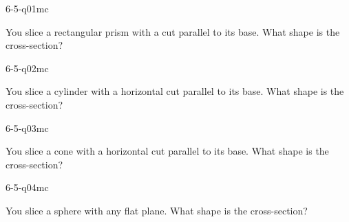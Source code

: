 

\begin{practiceQuestion}{6-5-q01}{mc}
\begin{questionText}
You slice a rectangular prism with a cut parallel to its base. What shape is the cross-section?
\end{questionText}
\end{practiceQuestion}

\begin{practiceQuestion}{6-5-q02}{mc}
\begin{questionText}
You slice a cylinder with a horizontal cut parallel to its base. What shape is the cross-section?
\end{questionText}
\end{practiceQuestion}

\begin{practiceQuestion}{6-5-q03}{mc}
\begin{questionText}
You slice a cone with a horizontal cut parallel to its base. What shape is the cross-section?
\end{questionText}
\end{practiceQuestion}

\begin{practiceQuestion}{6-5-q04}{mc}
\begin{questionText}
You slice a sphere with any flat plane. What shape is the cross-section?
\end{questionText}
\end{practiceQuestion}

